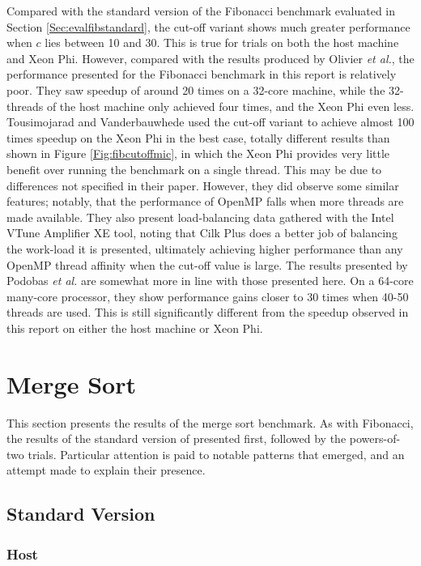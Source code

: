 \documentclass{report}
\begin{document}
Compared with the standard version of the Fibonacci benchmark evaluated in Section \ref{Sec:evalfibstandard}, the cut-off variant shows much greater performance when \(c\) lies between 10 and 30. This is true for trials on both the host machine and Xeon Phi. However, compared with the results produced by Olivier \textit{et al.}\cite{Olivier12}, the performance presented for the Fibonacci benchmark in this report is relatively poor. They saw speedup of around 20 times on a 32-core machine, while the 32-threads of the host machine only achieved four times, and the Xeon Phi even less. Tousimojarad and Vanderbauwhede\cite{Tousimojarad14} used the cut-off variant to achieve almost 100 times speedup on the Xeon Phi in the best case, totally different results than shown in Figure \ref{Fig:fibcutoffmic}, in which the Xeon Phi provides very little benefit over running the benchmark on a single thread. This may be due to differences not specified in their paper. However, they did observe some similar features; notably, that the performance of OpenMP falls when more threads are made available. They also present load-balancing data gathered with the Intel VTune Amplifier XE tool, noting that Cilk Plus does a better job of balancing the work-load it is presented, ultimately achieving higher performance than any OpenMP thread affinity when the cut-off value is large. The results presented by Podobas \textit{et al.}\cite{Podobas15} are somewhat more in line with those presented here. On a 64-core many-core processor, they show performance gains closer to 30 times when 40-50 threads are used. This is still significantly different from the speedup observed in this report on either the host machine or Xeon Phi.

\section{Merge Sort} \label{Sec:evalmsort}

This section presents the results of the merge sort benchmark. As with Fibonacci, the results of the standard version of presented first, followed by the powers-of-two trials. Particular attention is paid to notable patterns that emerged, and an attempt made to explain their presence.

\subsection{Standard Version} \label{Sec:evalmsortstandard}

\subsubsection{Host}
\end{document}
